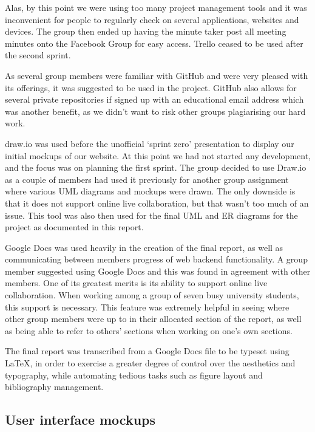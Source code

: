 \documentclass[a4paper,titlepage,12pt]{article}
\begin{document}
Alas, by this point we were using too many project management tools and it was
inconvenient for people to regularly check on several applications, websites
and devices. The group then ended up having the minute taker post all meeting
minutes onto the Facebook Group for easy access. Trello ceased to be used after
the second sprint.

As several group members were familiar with GitHub and were very pleased with
its offerings, it was suggested to be used in the project. GitHub also allows
for several private repositories if signed up with an educational email address
which was another benefit, as we didn't want to risk other groups plagiarising
our hard work.

draw.io was used before the unofficial `sprint zero' presentation to display
our initial mockups of our website. At this point we had not started any
development, and the focus was on planning the first sprint. The group decided
to use Draw.io as a couple of members had used it previously for another group
assignment where various UML diagrams and mockups were drawn. The only downside
is that it does not support online live collaboration, but that wasn't too much
of an issue. This tool was also then used for the final UML and ER diagrams for
the project as documented in this report.

Google Docs was used heavily in the creation of the final report, as well as
communicating between members progress of web backend functionality. A group
member suggested using Google Docs and this was found in agreement with other
members. One of its greatest merits is its ability to support online live
collaboration. When working among a group of seven busy university students,
this support is necessary. This feature was extremely helpful in seeing where
other group members were up to in their allocated section of the report, as
well as being able to refer to others' sections when working on one's own
sections.

The final report was transcribed from a Google Docs file to be typeset using
\LaTeX, in order to exercise a greater degree of control over the aesthetics
and typography, while automating tedious tasks such as figure layout and
bibliography management.

\newpage

\subsection{User interface mockups}
\end{document}
